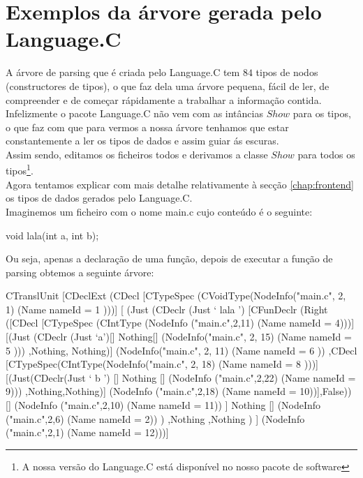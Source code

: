 \section{Exemplos da árvore gerada pelo Language.C}
A árvore de parsing que é criada pelo Language.C tem $84$ tipos de nodos (constructores de tipos), o que faz dela uma árvore pequena, fácil de ler, de compreender
e de começar rápidamente a trabalhar a informação contida.\\

Infelizmente o pacote Language.C não vem com as intâncias $Show$ para os tipos, o que faz com que para vermos a nossa árvore tenhamos que estar constantemente
a ler os tipos de dados e assim guiar ás escuras.\\
Assim sendo, editamos os ficheiros todos e derivamos a classe $Show$ para todos os tipos\footnote{A nossa versão do Language.C está disponível no nosso pacote de software}.\\

Agora tentamos explicar com mais detalhe relativamente à secção \ref{chap:frontend} os tipos de dados gerados pelo Language.C.\\

Imaginemos um ficheiro com o nome main.c cujo conteúdo é o seguinte:
\begin{code_files}
void lala(int a, int b);
\end{code_files}
Ou seja, apenas a declaração de uma função, depois de executar a função de parsing obtemos a seguinte árvore:
\begin{code_files}
CTranslUnit 
    [CDeclExt
        (CDecl
            [CTypeSpec (CVoidType(NodeInfo("main.c", 2, 1) (Name { nameId = 1 })))]
                [ (Just
                    (CDeclr (Just ` lala ')
                        [CFunDeclr (Right
                            ([CDecl [CTypeSpec (CIntType (NodeInfo ("main.c",2,11) (Name {nameId = 4})))]
                                [(Just (CDeclr (Just `a')[] Nothing[] (NodeInfo("main.c", 2, 15)
                                         (Name { nameId = 5 })))
                                    ,Nothing, Nothing)] (NodeInfo("main.c", 2, 11) (Name { nameId = 6 }))
                             ,CDecl [CTypeSpec(CIntType(NodeInfo("main.c", 2, 18) (Name { nameId = 8 })))]
                                 [(Just(CDeclr(Just ` b ') [] Nothing [] (NodeInfo ("main.c",2,22)
                                         (Name {nameId = 9})))
                                     ,Nothing,Nothing)]
                                 (NodeInfo ("main.c",2,18) (Name {nameId = 10}))],False))
                                 [] (NodeInfo ("main.c",2,10) (Name {nameId = 11}))
                                 ]
                                 Nothing [] (NodeInfo ("main.c",2,6) (Name {nameId = 2}))
                    )
                  ,Nothing
                  ,Nothing
                  )
                ] (NodeInfo ("main.c",2,1) (Name {nameId = 12})))]
\end{code_files}

